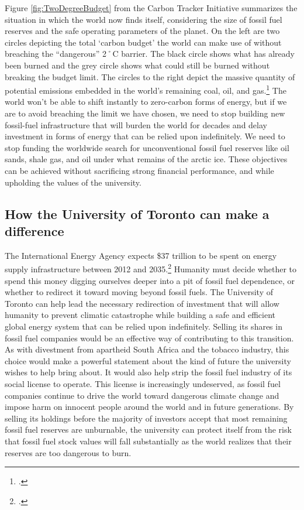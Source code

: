 \documentclass[10pt]{article}
\begin{document}
Figure \ref{fig:TwoDegreeBudget} from the Carbon Tracker Initiative summarizes the situation in which the world now finds itself, considering the size of fossil fuel reserves and the safe operating parameters of the planet.
On the left are two circles depicting the total `carbon budget' the world can make use of without breaching the ``dangerous'' 2˚C barrier.
The black circle shows what has already been burned and the grey circle shows what could still be burned without breaking the budget limit.
The circles to the right depict the massive quantity of potential  emissions embedded in the world's remaining coal, oil, and gas.\footcite[][p. 6]{CTI2012}
The world won't be able to shift instantly to zero-carbon forms of energy, but if we are to avoid breaching the limit we have chosen, we need to stop building new fossil-fuel infrastructure that will burden the world for decades and delay investment in forms of energy that can be relied upon indefinitely.
We need to stop funding the worldwide search for unconventional fossil fuel reserves like oil sands, shale gas, and oil under what remains of the arctic ice.
These objectives can be achieved without sacrificing strong financial performance, and while upholding the values of the university. 




\subsection{How the University of Toronto can make a difference}



The International Energy Agency expects \$37 trillion to be spent on energy supply infrastructure between 2012 and 2035.\footcite[][]{IEA2012factsheet}
Humanity must decide whether to spend this money digging ourselves deeper into a pit of fossil fuel dependence, or whether to redirect it toward moving beyond fossil fuels.
The University of Toronto can help lead the necessary redirection of investment that will allow humanity to prevent climatic catastrophe while building a safe and efficient global energy system that can be relied upon indefinitely.
Selling its shares in fossil fuel companies would be an effective way of contributing to this transition.
As with divestment from apartheid South Africa and the tobacco industry, this choice would make a powerful statement about the kind of future the university wishes to help bring about.
It would also help strip the fossil fuel industry of its social license to operate.
This license is increasingly undeserved, as fossil fuel companies continue to drive the world toward dangerous climate change and impose harm on innocent people around the world and in future generations.
By selling its holdings before the majority of investors accept that most remaining fossil fuel reserves are unburnable, the university can protect itself from the risk that fossil fuel stock values will fall substantially as the world realizes that their reserves are too dangerous to burn.
\end{document}
